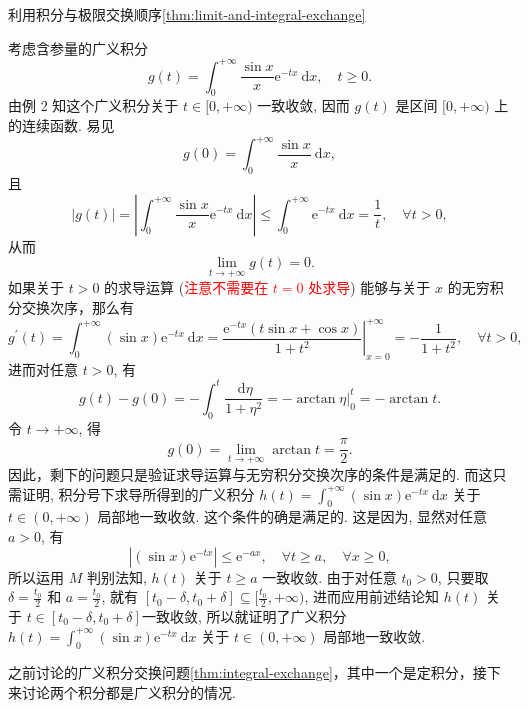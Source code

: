 \begin{note}
    利用积分与极限交换顺序\ref{thm:limit-and-integral-exchange}
\end{note}
\begin{solution}
    考虑含参量的广义积分
    \[
    g(t)=\int_0^{+\infty} \frac{\sin x}{x} \mathrm{e}^{-t x} \mathrm{~d} x, \quad t \geqslant 0 .
    \]
    由例 2 知这个广义积分关于 $t \in[0,+\infty)$ 一致收敛, 因而 $g(t)$ 是区间 $[0,+\infty)$ 上的连续函数. 易见
    \[
    g(0)=\int_0^{+\infty} \frac{\sin x}{x} \mathrm{~d} x,
    \]
    且
    \[
    |g(t)|=\left|\int_0^{+\infty} \frac{\sin x}{x} \mathrm{e}^{-t x} \mathrm{~d} x\right| \leqslant \int_0^{+\infty} \mathrm{e}^{-t x} \mathrm{~d} x=\frac{1}{t}, \quad \forall t>0,
    \]
    从而
    \[
    \lim _{t \rightarrow+\infty} g(t)=0 .
    \]
    如果关于 $t>0$ 的求导运算 (\textcolor{red}{注意不需要在 $t=0$ 处求导}) 能够与关于 $x$ 的无穷积分交换次序，那么有
    \[
    g^{\prime}(t)=\int_0^{+\infty}(\sin x) \mathrm{e}^{-t x} \mathrm{~d} x=\left.\frac{\mathrm{e}^{-t x}(t \sin x+\cos x)}{1+t^2}\right|_{x=0} ^{+\infty}=-\frac{1}{1+t^2}, \quad \forall t>0,
    \]
    进而对任意 $t>0$, 有
    \[
    g(t)-g(0)=-\int_0^t \frac{\mathrm{~d} \eta}{1+\eta^2}=-\left.\arctan \eta\right|_0 ^t=-\arctan t .
    \]
    令 $t \rightarrow+\infty$, 得
    \[
    g(0)=\lim _{t \rightarrow+\infty} \arctan t=\frac{\pi}{2} .
    \]
    因此，剩下的问题只是验证求导运算与无穷积分交换次序的条件是满足的. 而这只需证明, 积分号下求导所得到的广义积分 $h(t)=\int_0^{+\infty}(\sin x) \mathrm{e}^{-t x} \mathrm{~d} x$ 关于 $t \in(0,+\infty)$ 局部地一致收敛. 这个条件的确是满足的. 这是因为, 显然对任意 $a>0$, 有
    \[
    \left|(\sin x) \mathrm{e}^{-t x}\right| \leqslant \mathrm{e}^{-a x}, \quad \forall t \geqslant a, \quad \forall x \geqslant 0,
    \]
    所以运用 $M$ 判别法知, $h(t)$ 关于 $t \geqslant a$ 一致收敛. 由于对任意 $t_0>0$, 只要取 $\delta=\frac{t_0}{2}$ 和 $a=\frac{t_0}{2}$, 就有 $\left[t_0-\delta, t_0+\delta\right] \subseteq [\frac{t_0}{2},+\infty)$, 进而应用前述结论知 $h(t)$ 关于 $t \in\left[t_0-\delta, t_0+\delta\right]$一致收敛, 所以就证明了广义积分 $h(t)=\int_0^{+\infty}(\sin x) \mathrm{e}^{-t x} \mathrm{~d} x$ 关于 $t \in(0,+\infty)$ 局部地一致收敛.
\end{solution}
之前讨论的广义积分交换问题\ref{thm:integral-exchange}，其中一个是定积分，接下来讨论两个积分都是广义积分的情况.
